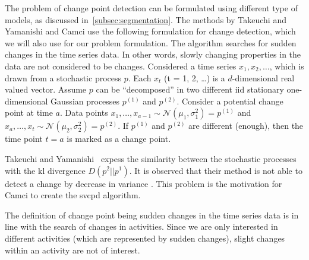 The problem of change point detection can be formulated using different type of models, as discussed in~\ref{subsec:segmentation}.
The methods by Takeuchi and Yamanishi \cite{takeuchi2006unifying} and Camci \cite{camci2010change} use the following formulation for change detection, which we will also use for our problem formulation.
The algorithm searches for sudden changes in the time series data.
In other words, slowly changing properties in the data are not considered to be changes.
Considered a time series $x_1, x_2, \dots$, which is drawn from a stochastic process $p$.
Each $x_t$ (t = 1, 2, \dots) is a $d$-dimensional real valued vector.
Assume $p$ can be ``decomposed'' in two different \gls{iid} stationary one-dimensional Gaussian processes $p^{(1)}$ and $p^{(2)}$.
Consider a potential change point at time $a$.
Data points $x_1, \dots, x_{a-1} \sim \mathcal{N}(\mu_1, \sigma_1^2) = p^{(1)}$ and $x_a, \dots, x_t \sim \mathcal{N}(\mu_2, \sigma_2^2 ) = p^{(2)}$.
If $p^{(1)}$ and $p^{(2)}$ are different (enough), then the time point $t = a$ is marked as a change point.

Takeuchi and Yamanishi~\cite{takeuchi2006unifying} expess the similarity between the stochastic processes with the \gls{kl} divergence $D(p^2||p^1)$.
It is observed that their method is not able to detect a change by decrease in variance \cite{takeuchi2006unifying,camci2010change}.
This problem is the motivation for Camci \cite{camci2010change} to create the \gls{svcpd} algorithm.

The definition of change point being sudden changes in the time series data is in line with the search of changes in activities.
Since we are only interested in different activities (which are represented by sudden changes), slight changes within an activity are not of interest.




